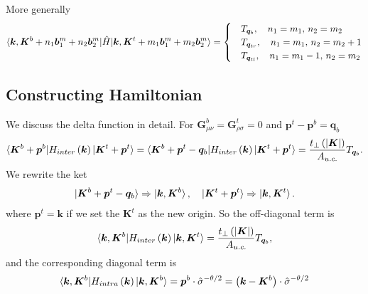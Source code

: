 \documentclass[10pt, oneside]{article}
\newcommand{\te}{\theta}
\newcommand{\p}[1]{\left(#1\right)}
\begin{document}
More generally
\begin{align} \label{eq91}
	\braket{\bm{k}, \bm{K}^{b} + n_{1} \bm{b}^{m}_{1} + n_{2} \bm{b}^{m}_{2}| \hat{H}|\bm{k}, \bm{K}^{t} + m_{1} \bm{b}^{m}_{1} + m_{2} \bm{b}^{m}_{2} } = \begin{cases}
		&T_{\bm{q}_{b}} ,\quad n_1 = m_1,\, n_2 = m_2 \\
		&T_{\bm{q}_{tr}}, \quad n_1 = m_1,\, n_2 = m_2 +1 \\
		&T_{\bm{q}_{tl}}, \quad n_1 = m_1-1,\, n_2 = m_2
	\end{cases}
\end{align}

\subsection{Constructing Hamiltonian}
We discuss the delta function in detail. For \(\bm{G}_{\mu \nu}^{b} = \bm{G}_{\rho \sigma}^{t} = 0\) and  \(\bm{p}^{t} - \bm{p}^{b} = \bm{q}_{b}\) 
\begin{align}
	\braket{\bm{K}^{b} + \bm{p}^{b}|H_{inter} \p{\bm{k}}|\bm{K}^{t} + \bm{p}^{t}} = \braket{\bm{K}^{b} + \bm{p}^{t} -\bm{q}_{b} |H_{inter} \p{\bm{k}}|\bm{K}^{t} + \bm{p}^{t}} = \frac{t_{\perp} \p{|\bm{K}|}}{A_{u.c.}} T_{\bm{q}_{b}}.
\end{align}
We rewrite the ket
\begin{align}
	\ket{\bm{K}^{b} + \bm{p}^{t} -\bm{q}_{b}} \Rightarrow \ket{\bm{k},\bm{K}^{b}} ,\quad \ket{\bm{K}^{t} + \bm{p}^{t}} \Rightarrow \ket{\bm{k}, \bm{K}^{t}}.
\end{align}
where \(\bm{p}^{t} = \bm{k}\) if we set the \(\bm{K}^{t}\) as the new origin. So the off-diagonal term is 
\begin{align}
	\braket{\bm{k},\bm{K}^{b} |H_{inter} \p{\bm{k}} |\bm{k}, \bm{K}^{t} } =  \frac{t_{\perp} \p{|\bm{K}|}}{A_{u.c.}} T_{\bm{q}_{b}},
\end{align}
and the corresponding diagonal term is 
\begin{align}
	\braket{\bm{k},\bm{K}^{b} |H_{intra} \p{\bm{k}} |\bm{k}, \bm{K}^{b} } = \bm{p}^{b} \cdot \hat{\sigma}^{-\te/2} = \p{\bm{k} - \bm{K}^{b}}\cdot \hat{\sigma}^{-\te/2}
\end{align}
\end{document}
